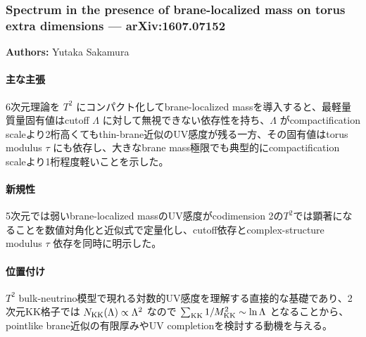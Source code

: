 \subsubsection{Spectrum in the presence of brane-localized mass on torus extra dimensions --- arXiv:1607.07152}

\textbf{Authors:} Yutaka Sakamura

\paragraph{主な主張}
6次元理論を $T^2$ にコンパクト化してbrane-localized massを導入すると、最軽量質量固有値はcutoff $\Lambda$ に対して無視できない依存性を持ち、$\Lambda$ がcompactification scaleより2桁高くてもthin-brane近似のUV感度が残る一方、その固有値はtorus modulus $\tau$ にも依存し、大きなbrane mass極限でも典型的にcompactification scaleより1桁程度軽いことを示した\cite{Sakamura:2016BraneTorus}。

\paragraph{新規性}
5次元では弱いbrane-localized massのUV感度がcodimension 2の$T^2$では顕著になることを数値対角化と近似式で定量化し、cutoff依存とcomplex-structure modulus $\tau$ 依存を同時に明示した。

\paragraph{位置付け}
$T^2$ bulk-neutrino模型で現れる対数的UV感度を理解する直接的な基礎であり、2次元KK格子では $N_{\rm KK}(\Lambda)\propto \Lambda^2$ なので $\sum_{\rm KK}1/M_{\rm KK}^2\sim\ln\Lambda$ となることから、pointlike brane近似の有限厚みやUV completionを検討する動機を与える。
